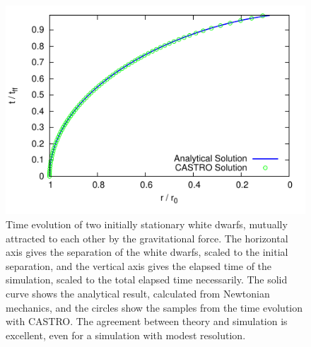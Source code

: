 \documentclass[12pt,preprint]{aastex}
\begin{document}
\clearpage

\begin{figure}
  \centering
  \includegraphics[scale=2.0]{freefall/plot_freefall}
  \caption{Time evolution of two initially stationary white dwarfs,
    mutually attracted to each other by the gravitational force. The
    horizontal axis gives the separation of the white dwarfs, scaled
    to the initial separation, and the vertical axis gives the elapsed
    time of the simulation, scaled to the total elapsed time
    necessarily. The solid curve shows the analytical result,
    calculated from Newtonian mechanics, and the circles show the
    samples from the time evolution with CASTRO. The agreement between
    theory and simulation is excellent, even for a simulation with
    modest resolution.}
  \label{Fig:Free Fall}
\end{figure}
\end{document}
